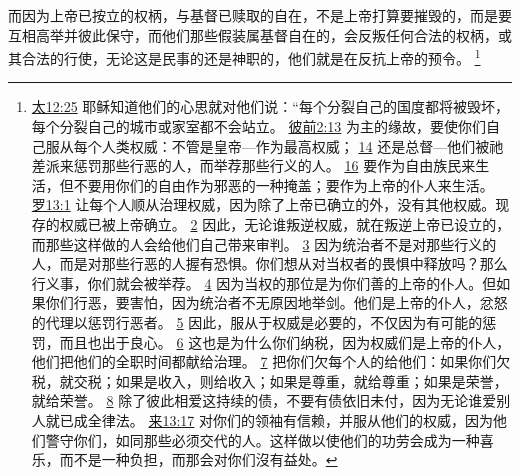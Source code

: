 \documentclass[12pt, a4paper, oneside]{ctexart}
\newcounter{parnum}[section]
\newcommand{\N}{%
   \noindent\refstepcounter{parnum}%
    \makebox[\parindent][l]{\textbf{\arabic{parnum}.}}}
\begin{document}
\N 而因为上帝已按立的权柄，与基督已赎取的自在，不是上帝打算要摧毁的，而是要互相高举并彼此保守，而他们那些假装属基督自在的，会反叛任何合法的权柄，或其合法的行使，无论这是民事的还是神职的，他们就是在反抗上帝的预令。
	\footnote {
		\href{https://biblehub.com/matthew/12-25.htm}{太12:25} 耶稣知道他们的心思就对他们说：“每个分裂自己的国度都将被毁坏，每个分裂自己的城市或家室都不会站立。
		\href{https://biblehub.com/1_peter/2-13.htm}{彼前2:13} 为主的缘故，要使你们自己服从每个人类权威：不管是皇帝---作为最高权威；
		\href{https://biblehub.com/1_peter/2-14.htm}{14} 还是总督---他们被祂差派来惩罚那些行恶的人，而举荐那些行义的人。
		\href{https://biblehub.com/1_peter/2-16.htm}{16} 要作为自由族民来生活，但不要用你们的自由作为邪恶的一种掩盖；要作为上帝的仆人来生活。
		\href{https://biblehub.com/romans/13-1.htm}{罗13:1} 让每个人顺从治理权威，因为除了上帝已确立的外，没有其他权威。现存的权威已被上帝确立。
		\href{https://biblehub.com/romans/13-2.htm}{2} 因此，无论谁叛逆权威，就在叛逆上帝已设立的，而那些这样做的人会给他们自己带来审判。
		\href{https://biblehub.com/romans/13-3.htm}{3} 因为统治者不是对那些行义的人，而是对那些行恶的人握有恐惧。你们想从对当权者的畏惧中释放吗？那么行义事，你们就会被举荐。
		\href{https://biblehub.com/romans/13-4.htm}{4} 因为当权的那位是为你们善的上帝的仆人。但如果你们行恶，要害怕，因为统治者不无原因地举剑。他们是上帝的仆人，忿怒的代理以惩罚行恶者。
		\href{https://biblehub.com/romans/13-5.htm}{5} 因此，服从于权威是必要的，不仅因为有可能的惩罚，而且也出于良心。
		\href{https://biblehub.com/romans/13-6.htm}{6} 这也是为什么你们纳税，因为权威们是上帝的仆人，他们把他们的全职时间都献给治理。
		\href{https://biblehub.com/romans/13-7.htm}{7} 把你们欠每个人的给他们：如果你们欠税，就交税；如果是收入，则给收入；如果是尊重，就给尊重；如果是荣誉，就给荣誉。
		\href{https://biblehub.com/romans/13-8.htm}{8} 除了彼此相爱这持续的债，不要有债依旧未付，因为无论谁爱别人就已成全律法。
		\href{https://biblehub.com/hebrews/13-17.htm}{来13:17} 对你们的领袖有信赖，并服从他们的权威，因为他们警守你们，如同那些必须交代的人。这样做以使他们的功劳会成为一种喜乐，而不是一种负担，而那会对你们沒有益处。
	}
\end{document}
